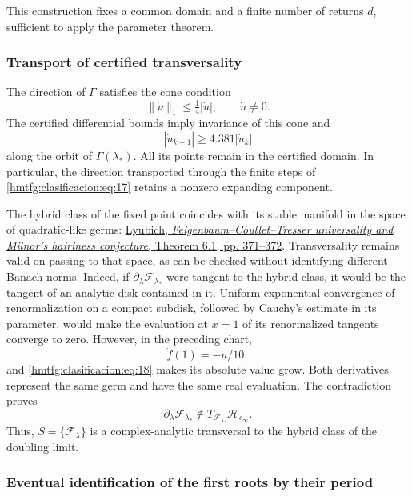 This construction fixes a common domain and a finite number of returns \(d\), sufficient to apply the parameter theorem.

\subsubsection{Transport of certified transversality}
\label{hmtfg:clasificacion:8.2}

The direction of \(\Gamma\) satisfies the cone condition
\[
\|\dot\nu\|_1\le\tfrac14|\dot u|,\qquad \dot u\ne0.
\]
The certified differential bounds imply invariance of this cone and
\begin{equation}
|\dot u_{k+1}|\ge4.381|\dot u_k|
\label{hmtfg:clasificacion:eq:18}
\end{equation}
along the orbit of \(\Gamma(\lambda_*)\). All its points remain in the certified domain. In particular, the direction transported through the finite steps of \eqref{hmtfg:clasificacion:eq:17} retains a nonzero expanding component.

The hybrid class of the fixed point coincides with its stable manifold in the space of quadratic-like germs: \href{https://www.maths.tcd.ie/EMIS/journals/Annals/149_2/lyubich.pdf}{Lyubich, \emph{Feigenbaum–Coullet–Tresser universality and Milnor's hairiness conjecture}, Theorem 6.1, pp. 371–372}. Transversality remains valid on passing to that space, as can be checked without identifying different Banach norms. Indeed, if \(\partial_\lambda\mathcal F_{\lambda_*}\) were tangent to the hybrid class, it would be the tangent of an analytic disk contained in it. Uniform exponential convergence of renormalization on a compact subdisk, followed by Cauchy’s estimate in its parameter, would make the evaluation at \(x=1\) of its renormalized tangents converge to zero. However, in the preceding chart,
\[
\dot f(1)=-\dot u/10,
\]
and \eqref{hmtfg:clasificacion:eq:18} makes its absolute value grow. Both derivatives represent the same germ and have the same real evaluation. The contradiction proves
\begin{equation}
\partial_\lambda\mathcal F_{\lambda_*}
\notin T_{\mathcal F_{\lambda_*}}\mathcal H_{c_\infty}.
\label{hmtfg:clasificacion:eq:19}
\end{equation}
Thus, \(S=\{\mathcal F_\lambda\}\) is a complex-analytic transversal to the hybrid class of the doubling limit.

\subsubsection{Eventual identification of the first roots by their period}
\label{hmtfg:clasificacion:8.3}

